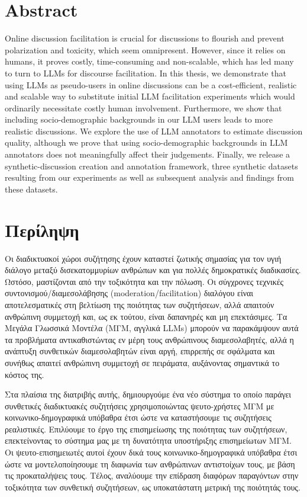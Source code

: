%

\chapter*{Abstract}
\label{sec:abstract}

Online discussion facilitation is crucial for discussions to flourish and prevent polarization and toxicity, which seem omnipresent. However, since it relies on humans, it proves costly, time-consuming and non-scalable, which has led many to turn to LLMs for discourse facilitation. In this thesis, we demonstrate that using LLMs as pseudo-users in online discussions can be a cost-efficient, realistic and scalable way to substitute initial LLM facilitation experiments which would ordinarily necessitate costly human involvement. Furthermore, we show that including socio-demographic backgrounds in our LLM users leads to more realistic discussions. We explore the use of LLM annotators to estimate discussion quality, although we prove that using socio-demographic backgrounds in LLM annotators does not meaningfully affect their judgements. Finally, we release a synthetic-discussion creation and annotation framework, three synthetic datasets resulting from our experiments as well as subsequent analysis and findings from these datasets.

\chapter*{Περίληψη}
\label{sec:abstract_greek}


Οι διαδικτυακοί χώροι συζήτησης έχουν καταστεί ζωτικής σημασίας για τον υγιή διάλογο μεταξύ δισεκατομμυρίων ανθρώπων και για πολλές δημοκρατικές διαδικασίες. Ωστόσο, μαστίζονται από την τοξικότητα και την πόλωση. Οι σύγχρονες τεχνικές συντονισμού/διαμεσολάβησης (moderation/facilitation) διαλόγου είναι αποτελεσματικές στη βελτίωση της ποιότητας των συζητήσεων, αλλά απαιτούν ανθρώπινη συμμετοχή και, ως εκ τούτου, είναι δαπανηρές και μη επεκτάσιμες. Τα Μεγάλα Γλωσσικά Μοντέλα (ΜΓΜ, αγγλικά LLMs) μπορούν να παρακάμψουν αυτά τα προβλήματα αντικαθιστώντας εν μέρη τους ανθρώπινους διαμεσολαβητές, αλλά η ανάπτυξη συνθετικών διαμεσολαβητών είναι αργή, επιρρεπής σε σφάλματα και συνήθως απαιτεί ανθρώπινη συμμετοχή σε πειράματα, αυξάνοντας σημαντικά το κόστος της. 

Στα πλαίσια της διατριβής αυτής, δημιουργούμε ένα νέο σύστημα το οποίο παράγει συνθετικές διαδικτυακές συζητήσεις χρησιμοποιώντας ψευτο-χρήστες ΜΓΜ με κοινωνικο-δημογραφικά υπόβαθρα έτσι ώστε να καταστήσουμε τις συζητήσεις ρεαλιστικές. Επιλύουμε το έργο της επισημείωσης της ποιότητας των συζητήσεων, επεκτείνοντας το σύστημα μας με τη δυνατότητα υποστήριξης επισημείωτων ΜΓΜ. Οι ψευτο-επισημειωτές αυτοί έχουν δικά τους κοινωνικο-δημογραφικά υπόβαθρα έτσι ώστε να μοντελοποίησουμε τη διαφωνία των ανθρώπινων αντιστοίχων τους, με βάση τις προκαταλήψεις τους. Τέλος, αναλύουμε την επίδραση διαφόρων παραγόντων στην τοξικότητα των συνθετική συζητήσεων, ως υποκατάστατη μετρική της ποιότητάς τους. 

